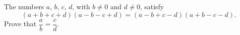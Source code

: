 The numbers $a$, $b$, $c$, $d$, with $b\ne0$ and $d\ne0$, satisfy
\[
(a+b+c+d)(a-b-c+d)=(a-b+c-d)(a+b-c-d).
\]
Prove that $\dfrac {a}{b}=\dfrac {c}{d}$.
